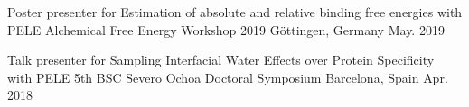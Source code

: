 

\begin{cventries}

  \cventry
    {Poster presenter for Estimation of absolute and relative binding free energies with PELE} %
    {Alchemical Free Energy Workshop 2019} %
    {Göttingen, Germany} %
    {May. 2019} %
    {}

  \cventry
    {Talk presenter for Sampling Interfacial Water Effects over Protein Specificity with PELE} %
    {5th BSC Severo Ochoa Doctoral Symposium} %
    {Barcelona, Spain} %
    {Apr. 2018} %
    {}

\end{cventries}
